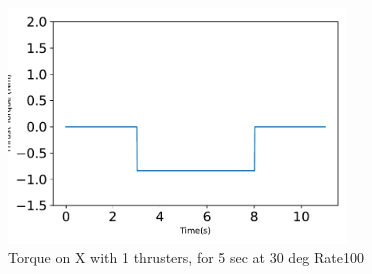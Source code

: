 \begin{figure}[htbp]\centerline{\includegraphics[width=0.8\textwidth]{AutoTeX/Torque_1Thrusters_5s_30deg_Loc2_Rate100}}\caption{Torque on X with 1 thrusters, for 5 sec at 30 deg Rate100}\label{fig:Torque_1Thrusters_5s_30deg_Loc2_Rate100}\end{figure}